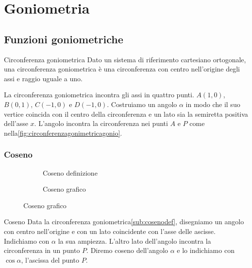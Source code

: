 \chapter{Goniometria}
\label{sec:GONIOMETRIA}

\section{Funzioni goniometriche}
\label{sec:FunzioniGoniometriche}
\begin{definizionet}{Circonferenza goniometrica}{}
	Dato un sistema di riferimento cartesiano ortogonale, una circonferenza goniometrica è una circonferenza con centro nell'origine degli assi e raggio uguale a uno. 
\end{definizionet}
 La circonferenza goniometrica incontra gli assi in quattro punti. $A(1,0)$, $B(0,1)$, $C(-1,0)$ e $D(-1,0)$. Costruiamo un angolo $\alpha$ in modo che il suo vertice coincida con il centro della circonferenza e un lato sia la semiretta positiva dell'asse $x$. L'angolo incontra la circonferenza nei punti $A$ e $P$ come nella\nobs\vref{fig:circonferenzagonimetricagonio}. 
\subsection{Coseno}
\label{sec:cosenogonio}
\begin{figure}
	\begin{subfigure}[b]{.5\linewidth}
		\centering
		
		\caption{Coseno definizione}\label{sub:cosenodef}
	\end{subfigure}%
	\begin{subfigure}[b]{.5\linewidth}
	\centering
		
		\caption{Coseno grafico}\label{sub:cosenograf}
	\end{subfigure}
	\label{ztzcos}
\end{figure}
\begin{definizionet}{Coseno}{}
Data la circonferenza goniometrica\nobs\vref{sub:cosenodef}, disegniamo un angolo con centro nell'origine e con un lato coincidente con l'asse delle ascisse. Indichiamo con $\alpha$ la sua ampiezza. L'altro lato dell'angolo incontra la circonferenza in un punto $P$. Diremo coseno dell'angolo $\alpha$ e lo indichiamo con $\cos\alpha$, l'ascissa del punto $P$.
\end{definizionet}
